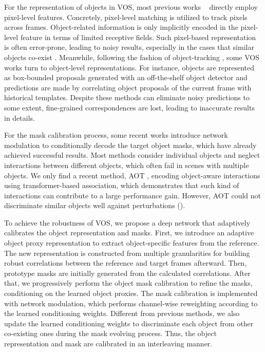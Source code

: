 \documentclass[sigconf]{acmart}
\begin{document}
For the representation of objects in VOS, most previous works  ~\cite{oh2019video,seong2020kernelized,lu2020video,cheng2021modular,wang2021swiftnet,xie2021efficient,hu2021learning,liang2020video,yang2020collaborative,hu2018videomatch,10.1145/3394171.3414035,10.1145/3394171.3413942} directly employ pixel-level features. Concretely, pixel-level matching \cite{hu2018videomatch} is utilized to track pixels across frames. Object-related information is only implicitly encoded in the pixel-level feature in terms of limited receptive fields. Such pixel-based representation is often error-prone, leading to noisy results, especially in the cases that similar objects co-exist \cite{liang2020video}. Meanwhile, following the fashion of object-tracking \cite{rt-vos}, some VOS works turn to object-level representations. For instance, objects are represented as box-bounded proposals \cite{voigtlaender2019boltvos,dmn-aoa} generated with an off-the-shelf object detector and predictions are made by correlating object proposals of the current frame with historical templates. Despite these methods can eliminate noisy predictions to some extent, fine-grained correspondences are lost, leading to inaccurate results in details.

For the mask calibration process, some recent works \cite{oh2019video,xie2021efficient} introduce network modulation \cite{huang2017arbitrary,park2019semantic,dumoulin2016learned,wang2018recovering} to conditionally decode the target object masks, which have already achieved successful results. Most methods \cite{oh2019video,xie2021efficient} consider individual objects and neglect interactions between different objects, which often fail in scenes with multiple objects. 
We only find a recent method, AOT \cite{yang2021associating}, encoding object-aware interactions using transformer-based association, which demonstrates that such kind of  interactions can contribute to a large performance gain. However, AOT could not discriminate similar objects well against perturbations (\fig{\ref{fig:teaser}}).


To achieve the robustness of VOS, we propose a deep network that adaptively calibrates the object representation and masks.
First, we introduce an adaptive object proxy representation to extract object-specific features from the reference. The new representation is constructed from multiple granularities for building robust correlations between the reference and target frames afterward. Then, prototype masks are initially generated from the calculated correlations. After that, we progressively perform the object mask calibration to refine the masks, conditioning on the learned object proxies. The mask calibration is implemented with network modulation, which performs channel-wise reweighting according to the learned conditioning weights. Different from previous methods, we also update the learned conditioning weights to discriminate each object from other co-existing ones during the mask evolving process. Thus, the object representation and mask are calibrated in an interleaving manner. 
\end{document}
